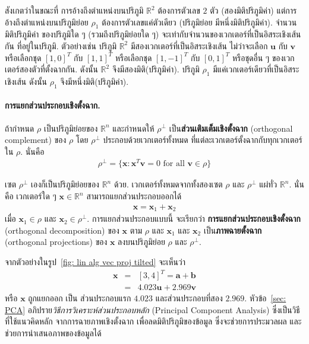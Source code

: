 สังเกตว่าในขณะที่
การอ้างถึงตำแหน่งบนปริภูมิ $\mathbb{R}^2$ ต้องการตัวเลข $2$ ตัว (สองมิติปริภูมิค่า)
แต่การอ้างถึงตำแหน่งบนปริภูมิย่อย $\rho_1$ ต้องการตัวเลขแค่ตัวเดียว (ปริภูมิย่อย มีหนึ่งมิติปริภูมิค่า).
จำนวนมิติปริภูมิค่า ของปริภูมิใด ๆ (รวมถึงปริภูมิย่อยใด ๆ) 
จะเท่ากับจำนวนของเวกเตอร์ที่เป็นอิสระเชิงเส้นกัน ที่อยู่ในปริภูมิ.
ตัวอย่างเช่น ปริภูมิ $\mathbb{R}^2$ มีสองเวกเตอร์ที่เป็นอิสระเชิงเส้น ไม่ว่าจะเลือก $\bm{u}$ กับ $\bm{v}$ หรือเลือกชุด $[1, 0]^T$ กับ $[1, 1]^T$ 
หรือเลือกชุด $[1, -1]^T$ กับ $[0, 1]^T$ หรือชุดอื่น ๆ ของเวกเตอร์สองตัวที่ตั้งฉากกัน.
ดังนั้น $\mathbb{R}^2$ จึงมีสองมิติ(ปริภูมิค่า).
ปริภูมิ $\rho_1$ มีแค่เวกเตอร์เดียวที่เป็นอิสระเชิงเส้น
ดังนั้น $\rho_1$ จึงมีหนึ่งมิติ(ปริภูมิค่า).


\paragraph{การแยกส่วนประกอบเชิงตั้งฉาก.}
ถ้ากำหนด $\rho$ เป็นปริภูมิย่อยของ $\mathbb{R}^n$
และกำหนดให้ $\rho^\perp$ เป็น\textbf{ส่วนเติมเต็มเชิงตั้งฉาก} (orthogonal complement) ของ $\rho$ โดย $\rho^\perp$ ประกอบด้วยเวกเตอร์ทั้งหมด
ที่แต่ละเวกเตอร์ตั้งฉากกับทุกเวกเตอร์ใน $\rho$.
นั่นคือ
\begin{eqnarray}
\rho^\perp = \{ \bm{x} : \bm{x}^T \bm{v} = 0 \mbox{ for all } \bm{v} \in \rho \}
\end{eqnarray}

เซต $\rho^\perp$ เองก็เป็นปริภูมิย่อยของ $\mathbb{R}^n$ ด้วย.
เวกเตอร์ทั้งหมดจากทั้งสองเซต $\rho$ และ $\rho^\perp$
แผ่ทั่ว $\mathbb{R}^n$.
นั่นคือ เวกเตอร์ใด ๆ $\bm{x} \in \mathbb{R}^n$ สามารถแยกส่วนประกอบออกได้
\begin{eqnarray}
\bm{x} = \bm{x}_1 + \bm{x}_2
\nonumber
\end{eqnarray}
เมื่อ $\bm{x}_1 \in \rho$ และ $\bm{x}_2 \in \rho^\perp$.
การแยกส่วนประกอบแบบนี้ จะเรียกว่า \textbf{การแยกส่วนประกอบเชิงตั้งฉาก} (orthogonal decomposition) ของ $\bm{x}$ ตาม $\rho$
และ $\bm{x}_1$ และ $\bm{x}_2$ เป็น\textbf{ภาพฉายตั้งฉาก} (orthogonal projections) ของ $\bm{x}$ ลงบนปริภูมิย่อย $\rho$ และ $\rho^\perp$.

จากตัวอย่างในรูป~\ref{fig: lin alg vec proj tilted}
จะเห็นว่า
\begin{eqnarray}
\bm{x} &=& [3, 4]^T = \bm{a} + \bm{b}
\nonumber \\
&=& 4.023 \bm{u}
+ 2.969 \bm{v}
\nonumber 
\end{eqnarray}
หรือ
$\bm{x}$ ถูกแยกออก เป็น
ส่วนประกอบแรก $4.023$
และส่วนประกอบที่สอง $2.969$.
หัวข้อ~\ref{sec: PCA} อภิปราย\textit{วิธีการวิเคราะห์ส่วนประกอบหลัก} (Principal Component Analysis)
ซึ่งเป็นวิธีที่ใช้แนวคิดหลัก
จากการฉายภาพเชิงตั้งฉาก
เพื่อลดมิติปริภูมิของข้อมูล ซึ่งจะช่วยการประมวลผล และช่วยการนำเสนอภาพของข้อมูลได้

